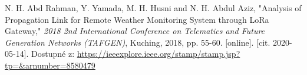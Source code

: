\begin{thebibliography}{9}














N. H. Abd Rahman, Y. Yamada, M. H. Husni and N. H. Abdul Aziz, "Analysis of Propagation Link for Remote Weather Monitoring System through LoRa Gateway," \textit{2018 2nd International Conference on Telematics and Future Generation Networks (TAFGEN)}, Kuching, 2018, pp. 55-60.
[online]. [cit. 2020-05-14]. Dostupné z: 
\url{
https://ieeexplore.ieee.org/stamp/stamp.jsp?tp=&arnumber=8580479
}
 



\end{thebibliography}
